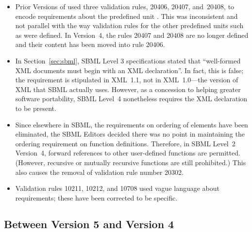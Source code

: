 \begin{itemize}
\item Prior Versions of \sbmltwo used three validation rules,
  20406, 20407, and~20408, to encode requirements about the
  predefined unit .  This was inconsistent and not
  parallel with the way validation rules for the other predefined
  units such as  were defined.  In Version~4, the
  rules 20407 and 20408 are no longer defined and their content
  has been moved into rule 20406.


\item In Section~\ref{sec:sbml}, SBML Level 3 specifications
  stated that ``well-formed XML documents must begin with an XML
  declaration''.  In fact, this is false; the requirement is
  stipulated in XML~1.1, not in XML~1.0---the version of XML that
  SBML actually uses.  However, as a concession to helping greater
  software portability, SBML Level~4 nonetheless requires the XML
  declaration to be present.

\item Since elsewhere in SBML, the requirements on ordering of
  elements have been eliminated, the SBML Editors decided there
  was no point in maintaining the ordering requirement on function
  definitions.  Therefore, in SBML Level~2 Version~4, forward
  references to other user-defined functions are permitted.
  (However, recursive or mutually recursive functions are still
  prohibited.)  This also causes the removal of validation rule
  number 20302.

\item Validation rules 10211, 10212, and 10708 used vague language
  about requirements; these have been corrected to be specific.

\end{itemize}


\subsection{Between Version 5 and Version 4}



\renewcommand{\thesubsection}{\Alph{section}.\arabic{subsection}}

